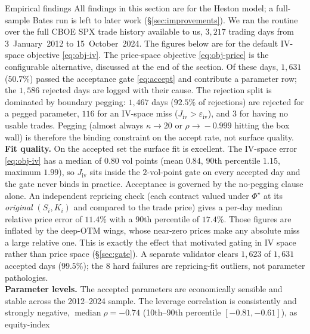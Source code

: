 \documentclass[a4paper, 11pt, reqno]{amsart}
\makeatletter
\def\section{\@startsection{section}{1}%
  \z@{.7\linespacing\@plus\linespacing}{.5\linespacing}%
  {\normalfont\bfseries\centering}}
\DeclareMathOperator{\med}{median}
\makeatother
\begin{document}
	\section{Empirical findings}\label{sec:empirical}
		All findings in this section are for the Heston model; a full-sample Bates run is left to later work
		(\S\ref{sec:improvements}). We ran the routine over the full CBOE SPX trade history available to us,
		$3{,}217$ trading days from 3~January~2012 to 15~October~2024. The figures below are for
		the default IV-space objective \eqref{eq:obj-iv}. The price-space objective
		\eqref{eq:obj-price} is the configurable alternative, discussed at the end of the section.
		Of these days, $1{,}631$ ($50.7\%$) passed the acceptance gate \eqref{eq:accept} and
		contribute a parameter row; the $1{,}586$ rejected days are logged with their cause.
		The rejection split is dominated by boundary pegging: $1{,}467$ days
		($92.5\%$ of rejections) are rejected for a pegged parameter, $116$ for an IV-space miss
		($J_{\mathrm{iv}}>\varepsilon_{\mathrm{iv}}$), and $3$ for having no usable trades.
		Pegging (almost always $\kappa\!\to\!20$ or $\rho\!\to\!-0.999$ hitting the box wall)
		is therefore the binding constraint on the accept rate, not surface quality.
		\\
		\textbf{Fit quality.} On the accepted set the surface fit is excellent. The IV-space
		error \eqref{eq:obj-iv} has a median of $0.80$ vol points (mean $0.84$, $90$th percentile
		$1.15$, maximum $1.99$), so $J_{\mathrm{iv}}$ sits inside the $2$-vol-point gate on every
		accepted day and the gate never binds in practice. Acceptance is governed by the no-pegging
		clause alone. An independent repricing check (each contract valued under $\Phi^\star$ at its
		\emph{original} $(S_i,K_i)$ and compared to the trade price) gives a per-day median relative
		price error of $11.4\%$ with a $90$th percentile of $17.4\%$. Those figures are inflated by the
		deep-OTM wings, whose near-zero prices make any absolute miss a large relative one. This is
		exactly the effect that motivated gating in IV space rather than price space
		(\S\ref{sec:gate}). A separate validator clears $1{,}623$ of $1{,}631$ accepted days
		($99.5\%$); the $8$ hard failures are repricing-fit outliers, not parameter pathologies.
		\\ 
		\textbf{Parameter levels.} The accepted parameters are economically sensible and stable
		across the 2012--2024 sample. The leverage correlation is consistently and strongly
		negative, $\med\rho=-0.74$ (10th--90th percentile $[-0.81,-0.61]$), as equity-index
\end{document}
